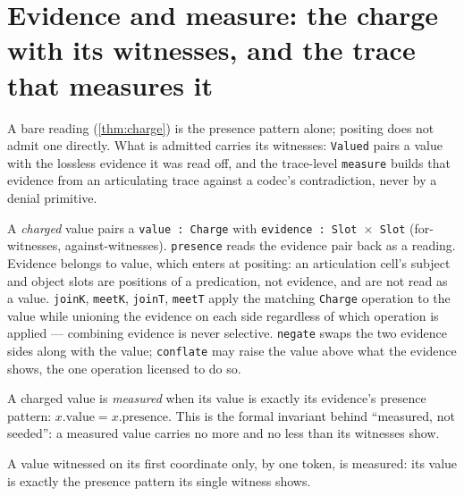 \section{Evidence and measure: the charge with its witnesses, and the trace that measures it}

A bare reading (\cref{thm:charge}) is the presence pattern alone; positing
does not admit one directly. What is admitted carries its witnesses:
\texttt{Valued} pairs a value with the lossless evidence it was read off,
and the trace-level \texttt{measure} builds that evidence from an
articulating trace against a codec's contradiction, never by a denial primitive.

\begin{proposition}\label{thm:charged}\leanok{}
A \emph{charged} value pairs a \texttt{value : Charge} with
\texttt{evidence : Slot \(\times\) Slot} (for-witnesses, against-witnesses).
\texttt{presence} reads the evidence pair back as a reading. Evidence belongs
to value, which enters at positing: an articulation cell's subject and object
slots are positions of a predication, not evidence, and are not read as a
value. \texttt{joinK}, \texttt{meetK}, \texttt{joinT},
\texttt{meetT} apply the matching \texttt{Charge} operation to the value
while unioning the evidence on each side regardless of which operation is
applied --- combining evidence is never selective. \texttt{negate} swaps the
two evidence sides along with the value; \texttt{conflate} may raise the
value above what the evidence shows, the one operation licensed to do so.
\end{proposition}

\begin{proposition}[Measured]\label{thm:charged-measured}\leanok{}
A charged value is \emph{measured} when its value is exactly its evidence's
presence pattern: \(x.\mathrm{value} = x.\mathrm{presence}\). This is the
formal invariant behind ``measured, not seeded'': a measured value carries no
more and no less than its witnesses show.
\end{proposition}

\begin{theorem}\label{thm:valued-onesided-measured}\leanok{}
A value witnessed on its first coordinate only, by one token, is measured: its
value is exactly the presence pattern its single witness shows.
\end{theorem}

